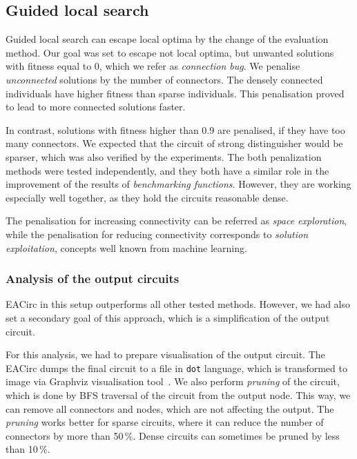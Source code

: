 \documentclass[
  print, %
  Table,   %
  nolof,     %
  nolot,     %
  11pt, %
  oneside  %
]{fithesis3}
\begin{document}
\subsection{Guided local search}
\label{subsec:res-ss-gls}

Guided local search can escape local optima by the change of the evaluation method. Our goal was set to escape not local optima, but unwanted solutions with fitness equal to 0, which we refer as \textit{connection bug}. We penalise \textit{unconnected} solutions by the number of connectors. The densely connected individuals have higher fitness than sparse individuals. This penalisation proved to lead to more connected solutions faster.

In contrast, solutions with fitness higher than 0.9 are penalised, if they have too many connectors. We expected that the circuit of strong distinguisher would be sparser, which was also verified by the experiments. The both penalization methods were tested independently, and they both have a similar role in the improvement of the results of \textit{benchmarking functions}. However, they are working especially well together, as they hold the circuits reasonable dense.

The penalisation for increasing connectivity can be referred as \textit{space exploration}, while the penalisation for reducing connectivity corresponds to \textit{solution exploitation}, concepts well known from machine learning.

\subsubsection{\textbf{Analysis of the output circuits}}
\label{subsubsec:res-ss-gls-circ-anal}

EACirc in this setup outperforms all other tested methods. However, we had also set a secondary goal of this approach, which is a simplification of the output circuit.

For this analysis, we had to prepare visualisation of the output circuit. The EACirc dumps the final circuit to a file in \texttt{dot} language, which is transformed to image via Graphviz visualisation tool~\cite{ellson2001graphviz}. We also perform \textit{pruning} of the circuit, which is done by BFS traversal of the circuit from the output node. This way, we can remove all connectors and nodes, which are not affecting the output. The \textit{pruning} works better for sparse circuits, where it can reduce the number of connectors by more than 50\,\%. Dense circuits can sometimes be pruned by less than 10\,\%.
\end{document}
